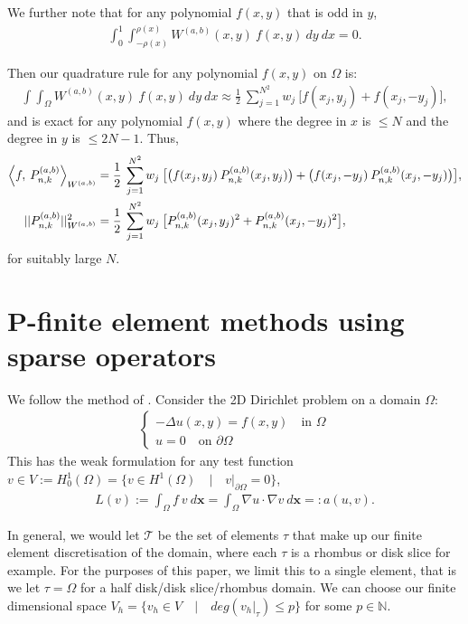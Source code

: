 \documentclass[11pt, oneside]{article}   	%
\newcommand{\half}{\frac{1}{2}}
\newcommand{\N}{\mathbb{N}}
\newcommand{\Pnk}{P_{n,k}}
\newcommand{\element}{\tau}
\newcommand{\FEset}{\mathcal{T}}
\begin{document}
We further note that for any polynomial \(f(x,y)\) that is odd in \(y\),
\begin{align}
\int_0^1 \int_{-\rho(x)}^{\rho(x)} W^{(a,b)}(x,y) \: f(x,y) \: dy \: dx = 0.
\end{align}


Then our quadrature rule for any polynomial \(f(x,y)\) on \(\Omega\) is:
\begin{align}
\int \int_\Omega W^{(a,b)}(x,y) \: f(x,y) \: dy \: dx \approx \half \: \sum_{j=1}^{N^2} w_j \: \big[ f(x_j, y_j) + f(x_j, -y_j) \big],
\end{align}
and is exact for any polynomial $f(x,y)$ where the degree in $x$ is $\le N$ and the degree in $y$ is $\le 2N-1$. Thus,
\begin{align}
\ip< f, \: \Pnk^{(a,b)} >_{W^{(a,b)}} &= \half \: \sum_{j=1}^{N^2} w_j \: \big[ \big(f(x_j, y_j) \: \Pnk^{(a,b)}(x_j, y_j)\big) +\big(f(x_j, -y_j) \: \Pnk^{(a,b)}(x_j, -y_j)\big) \big], \\
|| \Pnk^{(a,b)} ||_{W^{(a,b)}}^2 &= \half \: \sum_{j=1}^{N^2} w_j \: \big[ \Pnk^{(a,b)}(x_j, y_j)^2 + \Pnk^{(a,b)}(x_j, -y_j)^2 \big],
\end{align}
for suitably large $N$.



%
\section{P-finite element methods using sparse operators}

We follow the method of \cite{beuchler2006new}. Consider the 2D Dirichlet problem on a domain $\Omega$:
\begin{align}
	\begin{cases}
         - \Delta u(x,y) = f(x,y) \quad \text{in } \Omega \\
         u = 0 \quad \text{on } \partial \Omega
         \end{cases}
\end{align}
This has the weak formulation for any test function $v \in V := H_0^1(\Omega) = \{v \in H^1(\Omega) \quad | \quad v|_{\partial \Omega} = 0 \}$,
\begin{align}
	L(v) := \int_\Omega f \: v \: d\mathbf{x} = \int_\Omega \nabla u \cdot \nabla v \: d\mathbf{x} =: a(u,v).
\end{align}

In general, we would let $\FEset$ be the set of elements $\element$ that make up our finite element discretisation of the domain, where each $\element$ is a rhombus or disk slice for example. For the purposes of this paper, we limit this to a single element, that is we let $\element = \Omega$ for a half disk/disk slice/rhombus domain. We can choose our finite dimensional space $V_h = \{v_h \in V \quad | \quad deg(v_h|_\element) \le p\}$ for some $p \in \N$.
\end{document}
